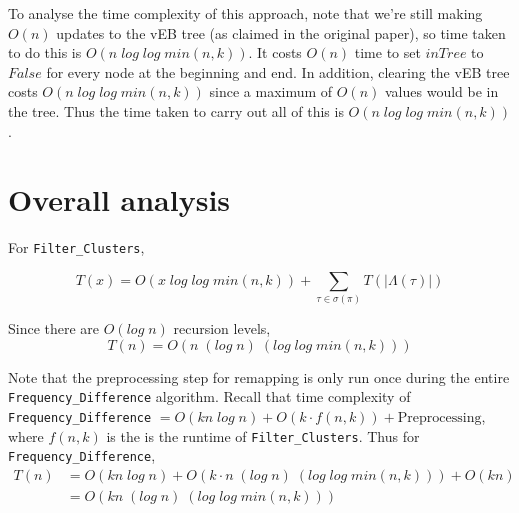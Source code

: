 \documentclass[a4paper]{article}
\begin{document}
    To analyse the time complexity of this approach, note that we're still making $O(n)$ updates to the vEB tree (as claimed in the original paper), so time taken to do this is $O(n\;log\;log\;min(n, k))$. It costs $O(n)$ time to set $inTree$ to $False$ for every node at the beginning and end. In addition, clearing the vEB tree costs $O(n\;log\;log\;min(n, k))$ since a maximum of $O(n)$ values would be in the tree. Thus the time taken to carry out all of this is $O(n\;log\;log\;min(n, k))$.

    \section{Overall analysis}

    For \texttt{Filter\_Clusters},

    \[T(x) = O(x\;log\;log\;min(n, k)) + \sum_{\tau\in\sigma(\pi)}T(|\Lambda(\tau)|)\]

    Since there are $O(log\;n)$ recursion levels,
    \[T(n) = O(n\;(log\;n)\;(log\;log\;min(n, k)))\]

    Note that the preprocessing step for remapping is only run once during the entire \texttt{Frequency\_Difference} algorithm. Recall that time complexity of \texttt{Frequency\_Difference} $= O(kn\;log\;n) + O(k \cdot f(n, k)) + \text{Preprocessing}$, where $f(n, k)$ is the is the runtime of \texttt{Filter\_Clusters}. Thus for \texttt{Frequency\_Difference},
    \begin{align*}
        T(n) &= O(kn\;log\;n) + O(k \cdot n\;(log\;n)\;(log\;log\;min(n, k))) + O(kn)\\
        &= O(kn\;(log\;n)\;(log\;log\;min(n, k)))
    \end{align*}
\end{document}
